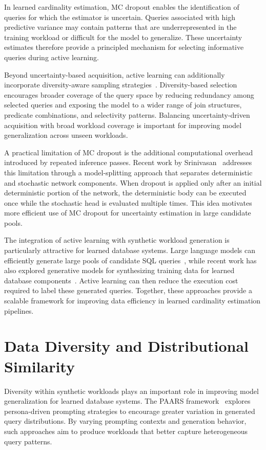 In learned cardinality estimation, MC dropout enables the identification of queries for which the estimator is uncertain. Queries associated with high predictive variance may contain patterns that are underrepresented in the training workload or difficult for the model to generalize. These uncertainty estimates therefore provide a principled mechanism for selecting informative queries during active learning.

Beyond uncertainty-based acquisition, active learning can additionally incorporate diversity-aware sampling strategies~\cite{DBLP:journals/tnn/LiWCJDO25}. Diversity-based selection encourages broader coverage of the query space by reducing redundancy among selected queries and exposing the model to a wider range of join structures, predicate combinations, and selectivity patterns. Balancing uncertainty-driven acquisition with broad workload coverage is important for improving model generalization across unseen workloads.

A practical limitation of MC dropout is the additional computational overhead introduced by repeated inference passes. Recent work by Srinivasan~\cite{Srinivasan2025Efficient} addresses this limitation through a model-splitting approach that separates deterministic and stochastic network components. When dropout is applied only after an initial deterministic portion of the network, the deterministic body can be executed once while the stochastic head is evaluated multiple times. This idea motivates more efficient use of MC dropout for uncertainty estimation in large candidate pools.

The integration of active learning with synthetic workload generation is particularly attractive for learned database systems. Large language models can efficiently generate large pools of candidate SQL queries~\cite{DBLP:journals/pvldb/SchmidtLBN25}, while recent work has also explored generative models for synthesizing training data for learned database components~\cite{DBLP:journals/corr/abs-2512-20271}. Active learning can then reduce the execution cost required to label these generated queries. Together, these approaches provide a scalable framework for improving data efficiency in learned cardinality estimation pipelines.

\section{Data Diversity and Distributional Similarity}

Diversity within synthetic workloads plays an important role in improving model generalization for learned database systems. The PAARS framework~\cite{DBLP:journals/corr/abs-2503-24228} explores persona-driven prompting strategies to encourage greater variation in generated query distributions. By varying prompting contexts and generation behavior, such approaches aim to produce workloads that better capture heterogeneous query patterns.

